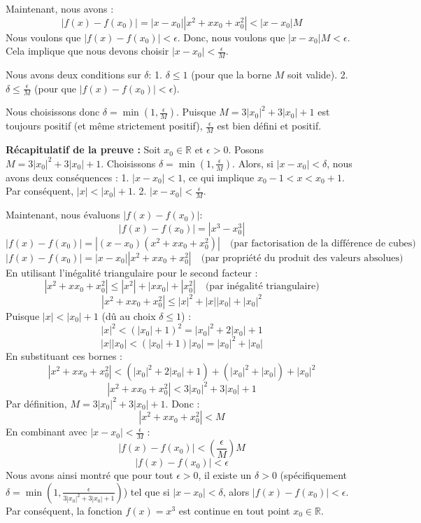 \documentclass[12pt,a4paper]{report}
\begin{document}
Maintenant, nous avons :
$$ |f(x) - f(x_0)| = |x - x_0| |x^2 + x x_0 + x_0^2| < |x - x_0| M $$
Nous voulons que $|f(x) - f(x_0)| < \epsilon$. Donc, nous voulons que $|x - x_0| M < \epsilon$.
Cela implique que nous devons choisir $|x - x_0| < \frac{\epsilon}{M}$.

Nous avons deux conditions sur $\delta$:
1.  $\delta \le 1$ (pour que la borne $M$ soit valide).
2.  $\delta \le \frac{\epsilon}{M}$ (pour que $|f(x) - f(x_0)| < \epsilon$).

Nous choisissons donc $\delta = \min\left(1, \frac{\epsilon}{M}\right)$. Puisque $M = 3|x_0|^2 + 3|x_0| + 1$ est toujours positif (et même strictement positif), $\frac{\epsilon}{M}$ est bien défini et positif.

\textbf{Récapitulatif de la preuve :}
Soit $x_0 \in \mathbb{R}$ et $\epsilon > 0$.
Posons $M = 3|x_0|^2 + 3|x_0| + 1$.
Choisissons $\delta = \min\left(1, \frac{\epsilon}{M}\right)$.
Alors, si $|x - x_0| < \delta$, nous avons deux conséquences :
1.  $|x - x_0| < 1$, ce qui implique $x_0 - 1 < x < x_0 + 1$. Par conséquent, $|x| < |x_0| + 1$.
2.  $|x - x_0| < \frac{\epsilon}{M}$.

Maintenant, nous évaluons $|f(x) - f(x_0)|$:
$$ |f(x) - f(x_0)| = |x^3 - x_0^3| $$
$$ |f(x) - f(x_0)| = |(x - x_0)(x^2 + x x_0 + x_0^2)| \quad \text{(par factorisation de la différence de cubes)} $$
$$ |f(x) - f(x_0)| = |x - x_0| |x^2 + x x_0 + x_0^2| \quad \text{(par propriété du produit des valeurs absolues)} $$
En utilisant l'inégalité triangulaire pour le second facteur :
$$ |x^2 + x x_0 + x_0^2| \le |x^2| + |x x_0| + |x_0^2| \quad \text{(par inégalité triangulaire)} $$
$$ |x^2 + x x_0 + x_0^2| \le |x|^2 + |x||x_0| + |x_0|^2 $$
Puisque $|x| < |x_0| + 1$ (dû au choix $\delta \le 1$) :
$$ |x|^2 < (|x_0| + 1)^2 = |x_0|^2 + 2|x_0| + 1 $$
$$ |x||x_0| < (|x_0| + 1)|x_0| = |x_0|^2 + |x_0| $$
En substituant ces bornes :
$$ |x^2 + x x_0 + x_0^2| < (|x_0|^2 + 2|x_0| + 1) + (|x_0|^2 + |x_0|) + |x_0|^2 $$
$$ |x^2 + x x_0 + x_0^2| < 3|x_0|^2 + 3|x_0| + 1 $$
Par définition, $M = 3|x_0|^2 + 3|x_0| + 1$. Donc :
$$ |x^2 + x x_0 + x_0^2| < M $$
En combinant avec $|x - x_0| < \frac{\epsilon}{M}$ :
$$ |f(x) - f(x_0)| < \left(\frac{\epsilon}{M}\right) M $$
$$ |f(x) - f(x_0)| < \epsilon $$
Nous avons ainsi montré que pour tout $\epsilon > 0$, il existe un $\delta > 0$ (spécifiquement $\delta = \min(1, \frac{\epsilon}{3|x_0|^2 + 3|x_0| + 1})$) tel que si $|x - x_0| < \delta$, alors $|f(x) - f(x_0)| < \epsilon$.
Par conséquent, la fonction $f(x) = x^3$ est continue en tout point $x_0 \in \mathbb{R}$.
\end{document}
